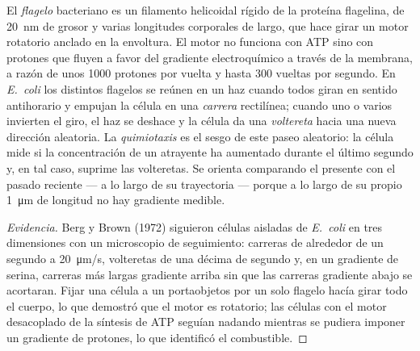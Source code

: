 \begin{proposition}\label{prop:b2:unicellular-diversity:flagellum}
El \emph{flagelo} bacteriano es un filamento helicoidal rígido de la
proteína flagelina, de \qty{20}{nm} de grosor y varias longitudes
corporales de largo, que hace girar un motor rotatorio anclado en la
envoltura. El motor no funciona con ATP sino con protones que fluyen a
favor del gradiente electroquímico a través de la membrana, a razón de
unos \num{1000} protones por vuelta y hasta \num{300} vueltas por
segundo. En \emph{E.~coli} los distintos flagelos se reúnen en un haz
cuando todos giran en sentido antihorario y empujan la célula en una
\emph{carrera} rectilínea; cuando uno o varios invierten el giro, el haz
se deshace y la célula da una \emph{voltereta} hacia una nueva dirección
aleatoria. La \emph{quimiotaxis} es el sesgo de este paseo aleatorio: la
célula mide si la concentración de un atrayente ha aumentado durante el
último segundo y, en tal caso, suprime las volteretas. Se orienta
comparando el presente con el pasado reciente --- a lo largo de su
trayectoria --- porque a lo largo de su propio
\qty{1}{\micro m} de longitud no hay gradiente medible.
\end{proposition}
\begin{proof}[Evidencia]
Berg y Brown (1972) siguieron células aisladas de \emph{E.~coli} en tres
dimensiones con un microscopio de seguimiento: carreras de alrededor de
un segundo a \qty{20}{\micro m/s}, volteretas de una décima de segundo y,
en un gradiente de serina, carreras más largas gradiente arriba sin que
las carreras gradiente abajo se acortaran. Fijar una célula a un
portaobjetos por un solo flagelo hacía girar todo el cuerpo, lo que
demostró que el motor es rotatorio; las células con el motor desacoplado
de la síntesis de ATP seguían nadando mientras se pudiera imponer un
gradiente de protones, lo que identificó el combustible.
\end{proof}

